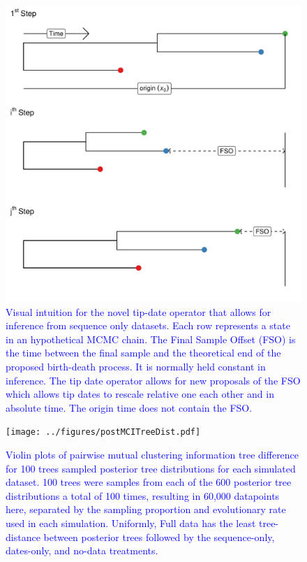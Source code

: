 \documentclass{article}
\begin{document}
{\begin{figure}[H]
\centering
\includegraphics[width=1\linewidth]{../figures/tipDateOp.pdf}
\caption{\textcolor{blue}{Visual intuition for the novel tip-date operator that allows for inference from sequence only datasets. Each row represents a state in an hypothetical MCMC chain. The Final Sample Offset (FSO) is the time between the final sample and the theoretical end of the proposed birth-death process. It is normally held constant in inference. The tip date operator allows for new proposals of the FSO which allows tip dates to rescale relative one each other and in absolute time. The origin time does not contain the FSO.}}
\label{fig:tipOp}
\end{figure}

\begin{figure}[H]
\centering
\texttt{[image: ../figures/postMCITreeDist.pdf]}
\caption{\textcolor{blue}{Violin plots of pairwise mutual clustering information tree difference for 100 trees sampled posterior tree distributions for each simulated dataset. 100 trees were samples from each of the 600 posterior tree distributions a total of 100 times, resulting in 60,000 datapoints here, separated by the sampling proportion and evolutionary rate used in each simulation. Uniformly, Full data has the least tree-distance between posterior trees followed by the sequence-only, dates-only, and no-data treatments.}}
\label{fig:ptreeDist}
\end{figure}

}
\end{document}
